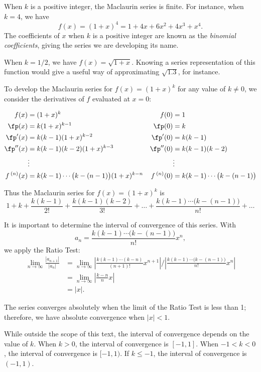 \begin{solution}
{When $k$ is a positive integer, the Maclaurin series is finite. For instance, when $k=4$, we have 
$$f(x) = (1+x)^4 = 1+4x+6x^2+4x^3+x^4.$$
The coefficients of $x$ when $k$ is a positive integer are known as the \emph{binomial coefficients}, giving the series we are developing its name.

When $k=1/2$, we have $f(x) = \sqrt{1+x}$. Knowing a series representation of this function would give a useful way of approximating $\sqrt{1.3}$, for instance.

To develop the Maclaurin series for $f(x) = (1+x)^k$ for any value of $k\neq0$, we consider the derivatives of $f$ evaluated at $x=0$:

{\small{
\begin{align*}
f(x) &= (1+x)^k & f(0) &= 1\\
\fp(x) &= k(1+x)^{k-1} & \fp(0) &=k\\
\fp'(x) &= k(k-1)(1+x)^{k-2} & \fp'(0) &=k(k-1)\\
\fp''(x) &= k(k-1)(k-2)(1+x)^{k-3} & \fp''(0) &=k(k-1)(k-2)\\
&\vdots & &\vdots\\
f\,^{(n)}(x) &= k(k-1)\cdots\big(k-(n-1)\big)(1+x)^{k-n} & f\,^{(n)}(0) &=k(k-1)\cdots\big(k-(n-1)\big)
\end{align*}
}}

Thus the Maclaurin series for $f(x) = (1+x)^k$ is
$$1+ k + \frac{k(k-1)}{2!} + \frac{k(k-1)(k-2)}{3!} + \ldots + \frac{k(k-1)\cdots\big(k-(n-1)\big)}{n!}+\ldots$$

It is important to determine the interval of convergence of this series. With 
$$a_n = \frac{k(k-1)\cdots\big(k-(n-1)\big)}{n!}x^n,$$
we apply the Ratio Test:
\begin{align*}
\lim_{n\to\infty}\frac{|a_{n+1}|}{|a_n|}&=\lim_{n\to\infty} \left|\frac{k(k-1)\cdots(k-n)}{(n+1)!}x^{n+1}\right|\Bigg/\left|\frac{k(k-1)\cdots\big(k-(n-1)\big)}{n!}x^n\right|\\
		&=\lim_{n\to\infty} \left|\frac{k-n}{n}x\right|\\
		&= |x|.
\end{align*}

The series converges absolutely when the limit of the Ratio Test is less than 1; therefore, we have absolute convergence when $|x|<1$. 

While outside the scope of this text, the interval of convergence depends on the value of $k$. When $k>0$, the interval of convergence is $[-1,1]$. When $-1<k<0$, the interval of convergence is $[-1,1)$. If $k\leq -1$, the interval of convergence is $(-1,1)$.
}
\end{solution}
